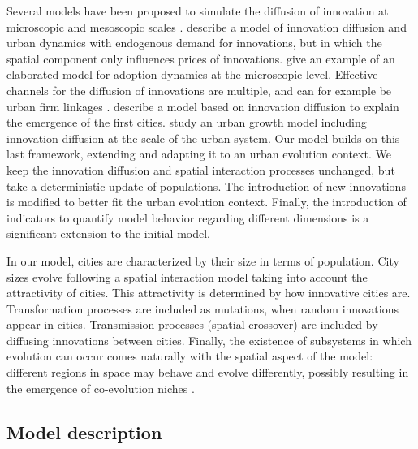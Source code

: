 \documentclass[letterpaper]{article}
\begin{document}
Several models have been proposed to simulate the diffusion of innovation at microscopic and mesoscopic scales \citep{kiesling2012agent}. \cite{blommestein1987adoption} describe a model of innovation diffusion and urban dynamics with endogenous demand for innovations, but in which the spatial component only influences prices of innovations. \cite{deffuant2005individual} give an example of an elaborated model for adoption dynamics at the microscopic level. Effective channels for the diffusion of innovations are multiple, and can for example be urban firm linkages \citep{rozenblat2007firm}. \cite{pumain2017simpoplocal} describe a model based on innovation diffusion to explain the emergence of the first cities. \cite{favaro2011gibrat} study an urban growth model including innovation diffusion at the scale of the urban system. Our model builds on this last framework, extending and adapting it to an urban evolution context. We keep the innovation diffusion and spatial interaction processes unchanged, but take a deterministic update of populations. The introduction of new innovations is modified to better fit the urban evolution context. Finally, the introduction of indicators to quantify model behavior regarding different dimensions is a significant extension to the initial model.

In our model, cities are characterized by their size in terms of population. City sizes evolve following a spatial interaction model taking into account the attractivity of cities. This attractivity is determined by how innovative cities are. Transformation processes are included as mutations, when random innovations appear in cities. Transmission processes (spatial crossover) are included by diffusing innovations between cities. Finally, the existence of subsystems in which evolution can occur comes naturally with the spatial aspect of the model: different regions in space may behave and evolve differently, possibly resulting in the emergence of co-evolution niches \citep{holland2012signals,raimbault2018co}.

\subsection{Model description}
\end{document}
